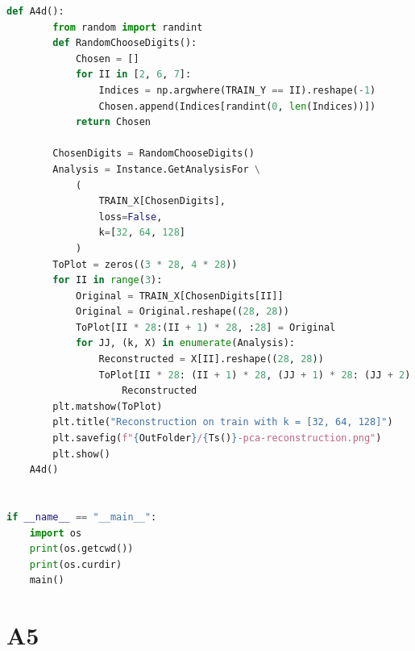 \documentclass[]{article}
\begin{document}
\begin{lstlisting}[language=python]
    def A4d():
        from random import randint
        def RandomChooseDigits():
            Chosen = []
            for II in [2, 6, 7]:
                Indices = np.argwhere(TRAIN_Y == II).reshape(-1)
                Chosen.append(Indices[randint(0, len(Indices))])
            return Chosen

        ChosenDigits = RandomChooseDigits()
        Analysis = Instance.GetAnalysisFor \
            (
                TRAIN_X[ChosenDigits],
                loss=False,
                k=[32, 64, 128]
            )
        ToPlot = zeros((3 * 28, 4 * 28))
        for II in range(3):
            Original = TRAIN_X[ChosenDigits[II]]
            Original = Original.reshape((28, 28))
            ToPlot[II * 28:(II + 1) * 28, :28] = Original
            for JJ, (k, X) in enumerate(Analysis):
                Reconstructed = X[II].reshape((28, 28))
                ToPlot[II * 28: (II + 1) * 28, (JJ + 1) * 28: (JJ + 2) * 28] = \
                    Reconstructed
        plt.matshow(ToPlot)
        plt.title("Reconstruction on train with k = [32, 64, 128]")
        plt.savefig(f"{OutFolder}/{Ts()}-pca-reconstruction.png")
        plt.show()
    A4d()


if __name__ == "__main__":
    import os
    print(os.getcwd())
    print(os.curdir)
    main()
        \end{lstlisting}
\section*{A5}
\end{document}
